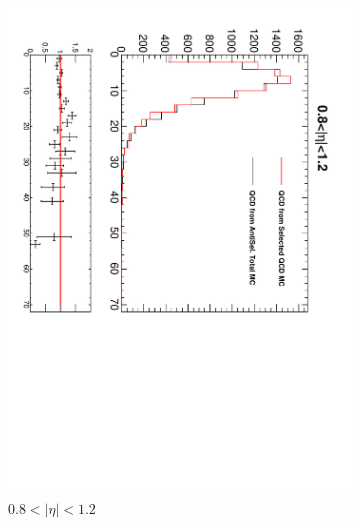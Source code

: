 \begin{figure}[htbp]
\begin{subfigure}{0.4\textwidth}
    \includegraphics*[trim = 0mm 0mm 15mm 0mm, clip, width=\textwidth, angle=90]{MetCompare_anti_eta3.pdf}
    \caption{$0.8<| \eta |<1.2$}
    \label{fig:qcd_met_eta3}
  \end{subfigure}
  \begin{subfigure}{0.4\textwidth}
    \centering

\end{subfigure}
\end{figure}
